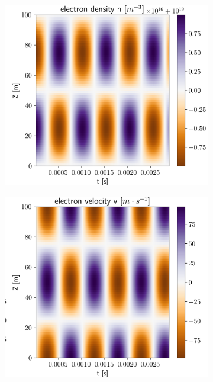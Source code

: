 \begin{figure}[H]
	\centering
	\begin{subfigure}[b]{0.32\textwidth}
		\centering
		\includegraphics[width=1\textwidth]{schemes/AdvectionSLAB_1D_timeplot_ne.png}
		\label{fig:AdvectionSLAB_densityEvolution}
	\end{subfigure}
	\begin{subfigure}[b]{0.32\textwidth}
		\centering
		\includegraphics[width=1\textwidth]{schemes/AdvectionSLAB_1D_timeplot_ve.png}

\end{subfigure}
\end{figure}

